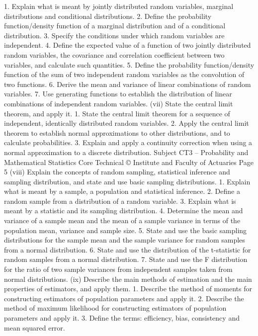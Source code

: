  1. Explain what is meant by jointly distributed random variables, marginal distributions and conditional distributions.  
 2. Define the probability function/density function of a marginal distribution and of a conditional distribution.  
 3. Specify the conditions under which random variables are independent.  
 4. Define the expected value of a function of two jointly distributed random variables, the covariance and correlation coefficient between two variables, and calculate such quantities.  
 5. Define the probability function/density function of the sum of two independent random variables as the convolution of two functions.  
 6. Derive the mean and variance of linear combinations of random variables.  
 7. Use generating functions to establish the distribution of linear combinations of independent random variables.  
(vii) State the central limit theorem, and apply it.  
 1. State the central limit theorem for a sequence of independent, identically distributed random variables.  
 2. Apply the central limit theorem to establish normal approximations to other distributions, and to calculate probabilities.  
 3. Explain and apply a continuity correction when using a normal approximation to a discrete distribution.  
 Subject CT3 – Probability and Mathematical Statistics Core Technical  
© Institute and Faculty of Actuaries Page 5 
(viii) Explain the concepts of random sampling, statistical inference and sampling distribution, and state and use basic sampling distributions.  
 1. Explain what is meant by a sample, a population and statistical inference.  
 2. Define a random sample from a distribution of a random variable.  
 3. Explain what is meant by a statistic and its sampling distribution.  
 4. Determine the mean and variance of a sample mean and the mean of a sample variance in terms of the population mean, variance and sample size.  
 5. State and use the basic sampling distributions for the sample mean and the sample variance for random samples from a normal distribution.  
 6. State and use the distribution of the t-statistic for random samples from a normal distribution.  
 7. State and use the F distribution for the ratio of two sample variances from independent samples taken from normal distributions.  
(ix) Describe the main methods of estimation and the main properties of estimators, and apply them.  
 1. Describe the method of moments for constructing estimators of population parameters and apply it.  
 2. Describe the method of maximum likelihood for constructing estimators of population parameters and apply it.  
 3. Define the terms: efficiency, bias, consistency and mean squared error.  

